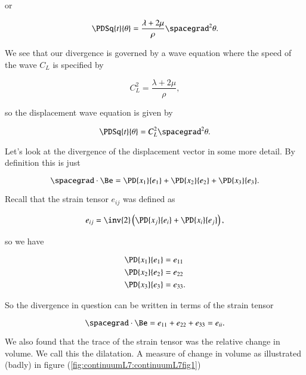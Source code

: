 or

\begin{equation}\label{eqn:continuumL7:50}
\PDSq{t}{\theta} = \frac{\lambda + 2 \mu}{\rho} \spacegrad^2 \theta.
\end{equation}

We see that our divergence is governed by a wave equation where the speed of the wave $C_L$ is specified by

\begin{equation}\label{eqn:continuumL7:70}
C_L^2 = \frac{\lambda + 2 \mu}{\rho},
\end{equation}

so the displacement wave equation is given by

\begin{equation}\label{eqn:continuumL7:90}
\PDSq{t}{\theta} = C_L^2 \spacegrad^2 \theta.
\end{equation}

Let's look at the divergence of the displacement vector in some more detail.  By definition this is just

\begin{equation}\label{eqn:continuumL7:110}
\spacegrad \cdot \Be = 
\PD{x_1}{e_1}
+\PD{x_2}{e_2}
+\PD{x_3}{e_3}.
\end{equation}

Recall that the strain tensor $e_{ij}$ was defined as

\begin{equation}\label{eqn:continuumL7:130}
e_{ij} = \inv{2} \left( 
\PD{x_j}{e_i}
+
\PD{x_i}{e_j}
\right),
\end{equation}

so we have

\begin{align}\label{eqn:continuumL7:150}
\PD{x_1}{e_1} &= e_{11} \\
\PD{x_2}{e_2} &= e_{22} \\
\PD{x_3}{e_3} &= e_{33}.
\end{align}

So the divergence in question can be written in terms of the strain tensor

\begin{equation}\label{eqn:continuumL7:170}
\spacegrad \cdot \Be = 
e_{11}
+e_{22}
+e_{33} = e_{ii}.
\end{equation}

We also found that the trace of the strain tensor was the relative change in volume.  We call this the dilatation.  A measure of change in volume as illustrated (badly) in figure (\ref{fig:continuumL7:continuumL7fig1})

